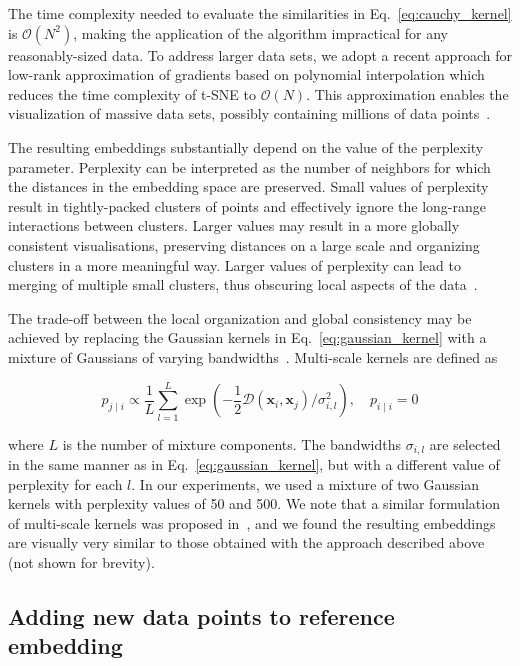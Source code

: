 \documentclass[runningheads]{llncs}
\begin{document}
The time complexity needed to evaluate the similarities in
Eq.~\ref{eq:cauchy_kernel} is $\mathcal{O}(N^2)$, making the application of
the algorithm impractical for any reasonably-sized data. To address larger data
sets, we adopt a recent approach for low-rank approximation of
gradients based on polynomial interpolation which reduces the time
complexity of t-SNE to $\mathcal{O}(N)$. This approximation enables the
visualization of massive data sets, possibly containing millions of data
points~\cite{fi_tsne}.

The resulting embeddings substantially depend on the value of the perplexity
parameter. Perplexity can be interpreted as the number of
neighbors for which the distances in the embedding space are preserved. Small
values of perplexity result in tightly-packed clusters of points and effectively
ignore the long-range interactions between clusters. Larger values may result
in a more globally consistent visualisations, preserving distances on a large
scale and organizing clusters in a more meaningful way. Larger values of
perplexity can lead to merging of multiple small clusters, thus obscuring
local aspects of the data~\cite{art_of_using_tsne}.

The trade-off between the local organization and global consistency may be
achieved by replacing the Gaussian kernels in Eq.~\ref{eq:gaussian_kernel} with
a mixture of Gaussians of varying bandwidths~\cite{multiscale_tsne}.
Multi-scale kernels are defined as

\begin{equation}
p_{j \mid i} \propto \frac{1}{L} \sum_{l=1}^{L} \exp \left ( - \frac{1}{2} \mathcal{D}(\mathbf{x}_i, \mathbf{x}_j ) / \sigma_{i,l}^2 \right ), \quad p_{i \mid i} = 0
\label{eq:multiscale}
\end{equation}

\noindent where $L$ is the number of mixture components. The bandwidths
$\sigma_{i,l}$ are selected in the same manner as in
Eq.~\ref{eq:gaussian_kernel}, but with a different value of perplexity for each
$l$. In our experiments, we used a mixture of two Gaussian kernels with
perplexity values of 50 and 500. We note that a similar formulation of
multi-scale kernels was proposed in~\cite{art_of_using_tsne}, and we found the
resulting embeddings are visually very similar to those obtained with the
approach described above (not shown for brevity).


\subsection{Adding new data points to reference embedding\label{sec:transfer}}
\end{document}
